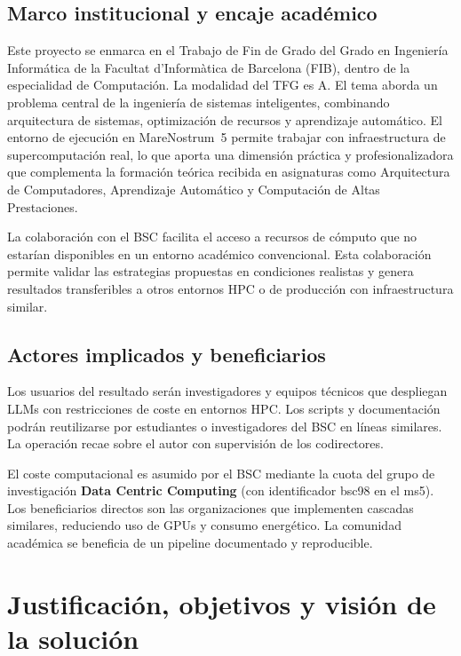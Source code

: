 \subsection{Marco institucional y encaje académico}

Este proyecto se enmarca en el Trabajo de Fin de Grado del Grado en Ingeniería Informática de la Facultat d'Informàtica de Barcelona (FIB), dentro de la especialidad de Computación. La modalidad del TFG es A. El tema aborda un problema central de la ingeniería de sistemas inteligentes, combinando arquitectura de sistemas, optimización de recursos y aprendizaje automático. El entorno de ejecución en MareNostrum~5 permite trabajar con infraestructura de supercomputación real, lo que aporta una dimensión práctica y profesionalizadora que complementa la formación teórica recibida en asignaturas como Arquitectura de Computadores, Aprendizaje Automático y Computación de Altas Prestaciones.

La colaboración con el BSC facilita el acceso a recursos de cómputo que no estarían disponibles en un entorno académico convencional. Esta colaboración permite validar las estrategias propuestas en condiciones realistas y genera resultados transferibles a otros entornos HPC o de producción con infraestructura similar.

\subsection{Actores implicados y beneficiarios}

Los usuarios del resultado serán investigadores y equipos técnicos que despliegan LLMs con restricciones de coste en entornos HPC. Los scripts y documentación podrán reutilizarse por estudiantes o investigadores del BSC en líneas similares. La operación recae sobre el autor con supervisión de los codirectores.

El coste computacional es asumido por el BSC mediante la cuota del grupo de investigación \textbf{Data Centric Computing} (con identificador bsc98 en el ms5). Los beneficiarios directos son las organizaciones que implementen cascadas similares, reduciendo uso de GPUs y consumo energético. La comunidad académica se beneficia de un pipeline documentado y reproducible.

\section{Justificación, objetivos y visión de la solución}

